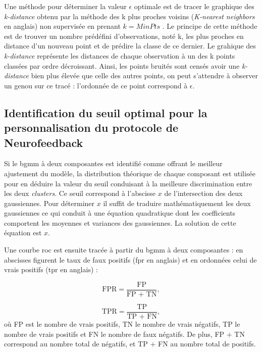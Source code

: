 Une méthode pour déterminer la valeur $\epsilon$ optimale est de tracer le graphique des \textit{k-distance} obtenu par la méthode des k plus proches voisins 
(\textit{K-nearest neighbors} en anglais) non supervisée en prenant $k = MinPts$ \citep{James2013, Goldberger2005}. Le principe de cette méthode
est de trouver un nombre prédéfini d'observations, noté k, les plus proches en distance d'un nouveau point et de prédire la classe de ce dernier. 
Le grahique des \textit{k-distance} représente les distances de chaque observation à un des k points classées par ordre décroissant. 
Ainsi, les points bruités sont censés avoir une \textit{k-distance} bien plus élevée que celle des autres points, on peut 
s'attendre à observer un genou sur ce tracé : l'ordonnée de ce point correspond à $\epsilon$.


\subsection{Identification du seuil optimal pour la personnalisation du protocole de Neurofeedback}

Si le \gls{bgmm} à deux composantes est identifié comme offrant le meilleur ajustement du modèle, la distribution théorique de chaque composant 
est utilisée pour en déduire la valeur du seuil conduisant à la meilleure discrimination entre les deux \textit{clusters}. Ce seuil correspond
à l'abscisse $x$ de l'intersection des deux gaussiennes. Pour déterminer $x$ il suffit de traduire mathématiquement les deux gaussiennes ce qui
conduit à une équation quadratique dont les coefficients comportent les moyennes et variances des gaussiennes. La solution de cette équation est $x$.


Une courbe \gls{roc} est ensuite tracée à partir du \gls{bgmm} à deux composantes : en abscisses figurent le taux de faux positifs (\gls{fpr} en anglais) 
et en ordonnées celui de vrais positifs (\gls{tpr} en anglais) \citep{James2013} :

\begin{equation}
\label{eq:tbr_fpr_tpr}
\text{FPR} = \frac{\text{FP}}{\text{FP + TN}},
\end{equation}

\begin{equation}
\label{eq:tbr_tpr}
\text{TPR} = \frac{\text{TP}}{\text{TP + FN}},
\end{equation}
où FP est le nombre de vrais positifs, TN le nombre de vrais négatifs, TP le nombre de vrais positifs et FN le nombre de faux négatifs. 
De plus, FP $+$ TN correspond au nombre total de négatifs, et TP $+$ FN au nombre total de positifs. 

